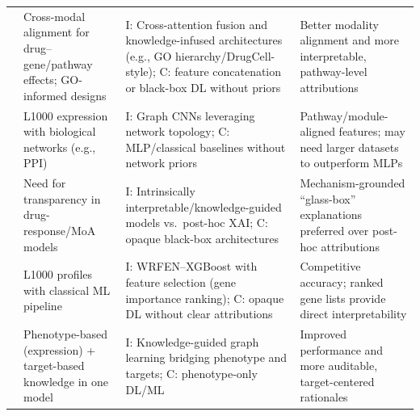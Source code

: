 \documentclass[twocolumn,12pt,a4paper]{article}
\begin{document}
{\begin{table}[t]
\begin{tabular}{p{3.1cm} p{4.8cm} p{5.8cm} p{3.3cm}}
    \cite{elabd2024simple} &
    Cross-modal alignment for drug–gene/pathway effects; GO-informed designs &
    I\@: Cross-attention fusion and knowledge-infused architectures (e.g., GO hierarchy/DrugCell-style); 
    C\@: feature concatenation or black-box DL without priors &
    Better modality alignment and more interpretable, pathway-level attributions \\[0.35em]

    \cite{mcdermott2019deep} &
    L1000 expression with biological networks (e.g., PPI) &
    I\@: Graph CNNs leveraging network topology; 
    C\@: MLP/classical baselines without network priors &
    Pathway/module-aligned features; may need larger datasets to outperform MLPs \\[0.35em]

    \cite{samal2022opportunities} &
    Need for transparency in drug-response/MoA models &
    I\@: Intrinsically interpretable/knowledge-guided models vs.\ post-hoc XAI; 
    C\@: opaque black-box architectures &
    Mechanism-grounded “glass-box” explanations preferred over post-hoc attributions \\[0.35em]

    \cite{lu2021drug} &
    L1000 profiles with classical ML pipeline &
    I\@: WRFEN–XGBoost with feature selection (gene importance ranking); 
    C\@: opaque DL without clear attributions &
    Competitive accuracy; ranked gene lists provide direct interpretability \\[0.35em]

    \cite{ye2025knowledge} &
    Phenotype-based (expression) + target-based knowledge in one model &
    I\@: Knowledge-guided graph learning bridging phenotype and targets; 
    C\@: phenotype-only DL/ML &
    Improved performance and more auditable, target-centered rationales \\
    \bottomrule
  \end{tabular}
\end{table}
\clearpage
}
\end{document}
